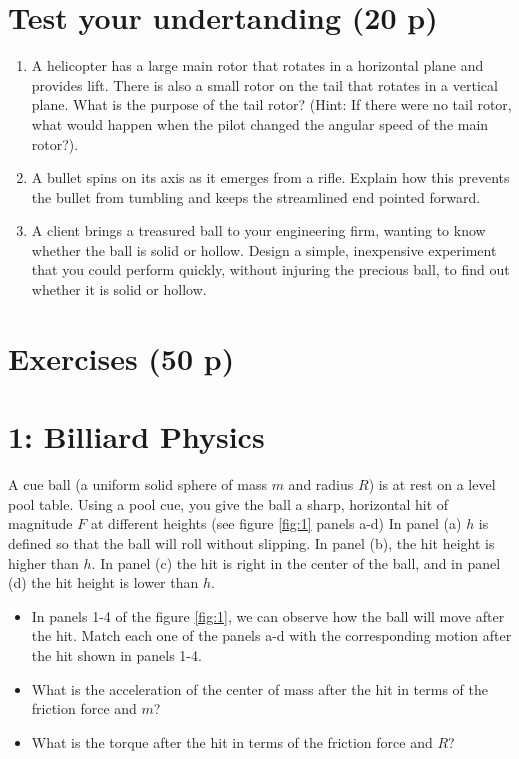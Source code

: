 \documentclass[12pt]{article}
\begin{document}
\section*{Test your undertanding (20 p)}
\vspace{7mm}


\begin{enumerate}
    \item A helicopter has a large main rotor that rotates in a horizontal
    plane and provides lift. There is also a small rotor on the tail
    that rotates in a vertical plane. What is the purpose of the tail rotor?
    (Hint: If there were no tail rotor, what would happen when the
    pilot changed the angular speed of the main rotor?).
    \item A bullet spins on its axis as it emerges from a rifle. Explain
    how this prevents the bullet from tumbling and keeps the streamlined
    end pointed forward.
    \item A  client brings a treasured ball to your engineering
    firm, wanting to know whether the ball is solid or hollow. 
    Design a simple, inexpensive experiment that you could perform
    quickly, without injuring the precious ball, to find out whether it is
    solid or hollow.
  
\end{enumerate}

\section*{Exercises (50 p)}
\vspace{7mm}

\section*{1: Billiard Physics}

A cue ball (a uniform solid sphere of mass $m$ and radius $R$) is at
rest on a level pool table. Using a pool cue, you give the ball a
sharp, horizontal hit of magnitude $F$ at different heights (see figure \ref{fig:1} panels a-d)
In panel (a) $h$ is defined so that the ball will roll without slipping. In panel (b), the hit height is higher than $h$. In panel (c) the hit is right in the center of the ball, and in panel (d) the hit height is lower than
$h$. 
\begin{itemize}
    \item In panels 1-4 of the figure \ref{fig:1}, we can observe how the ball will move after the hit. Match each one of the panels a-d with the corresponding motion after the hit shown in panels 1-4.
    \item What is the acceleration of the center of mass after the hit in terms of the friction force and $m$?
    \item What is the torque after the hit in terms of the friction force and $R$?
\end{itemize}
\end{document}
